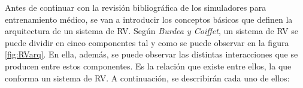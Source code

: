 Antes de continuar con la revisión bibliográfica de los simuladores para entrenamiento médico, se van a introducir los conceptos básicos que definen la arquitectura de un sistema de \ac{RV}. %
Según \emph{Burdea y Coiffet}\cite{burdea2003virtual}, un sistema de \ac{RV} se puede dividir en cinco componentes tal y como se puede observar en la figura \ref{fig:RVarq}. En ella, además, se puede observar las distintas interacciones que se producen entre estos componentes. Es la relación que existe entre ellos, la que conforma un sistema de \ac{RV}. A continuación, se describirán cada uno de ellos:
